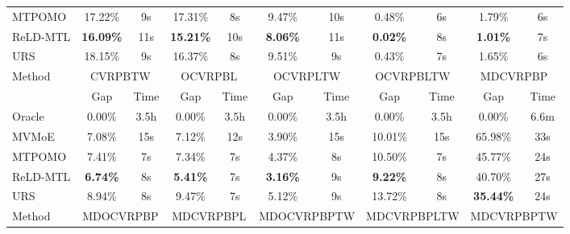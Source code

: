 \documentclass{article}
\theoremstyle{plain}
\theoremstyle{definition}
\theoremstyle{remark}
\begin{document}
\begin{table}[htbp]
{\begin{tabular}{l|cc|cc|cc|cc|cc}
MTPOMO 
&  17.22\% & 9s 
&  17.31\% & 8s 
&  9.47\%  & 10s 
& 0.48\%  & \multicolumn{1}{c|}{6s} 
& 1.79\%  & \multicolumn{1}{c}{6s} \\

ReLD-MTL 
&  \cellcolor[HTML]{D0CECE}\textbf{16.09\%} & 11s
&  \cellcolor[HTML]{D0CECE}\textbf{15.21\%} & 10s
&  \cellcolor[HTML]{D0CECE}\textbf{8.06\%}  & 11s
& \cellcolor[HTML]{D0CECE}\textbf{0.02\%}  & \multicolumn{1}{c|}{8s}
& \cellcolor[HTML]{D0CECE}\textbf{1.01\%}  & \multicolumn{1}{c}{7s} \\

URS
&  18.15\% & 9s
&  16.37\% & 8s
&  9.51\%  & 9s
& 0.43\%  & \multicolumn{1}{c|}{7s}
& 1.65\%  & \multicolumn{1}{c}{6s} \\



    \midrule
    \multirow{2}[2]{*}{Method} & \multicolumn{2}{c|}{CVRPBTW} & \multicolumn{2}{c|}{OCVRPBL} & \multicolumn{2}{c|}{OCVRPLTW} & \multicolumn{2}{c|}{OCVRPBLTW} & \multicolumn{2}{c}{MDCVRPBP} \\
          & Gap   & Time  & Gap   & Time  & Gap   & Time  & Gap   & \multicolumn{1}{c|}{Time} & Gap   & \multicolumn{1}{c}{Time} \\
    \midrule
    Oracle & 0.00\% & 3.5h  & 0.00\% & 3.5h  & 0.00\% & 3.5h  & 0.00\% & \multicolumn{1}{c|}{3.5h} & 0.00\% & \multicolumn{1}{c}{6.6m} \\
    MVMoE & 7.08\% & 15s   & 7.12\% & 12s   & 3.90\% & 15s   & 10.01\% & \multicolumn{1}{c|}{15s} &  65.98\% & \multicolumn{1}{c}{33s} \\
    MTPOMO & 7.41\% & 7s    & 7.34\% & 7s    & 4.37\% & 8s    & 10.50\% & \multicolumn{1}{c|}{7s} &  45.77\% & \multicolumn{1}{c}{24s} \\
    ReLD-MTL & \cellcolor[HTML]{D0CECE}\textbf{6.74\%} & 8s    & \cellcolor[HTML]{D0CECE}\textbf{5.41\%} & 7s    & \cellcolor[HTML]{D0CECE}\textbf{3.16\%} & 9s    & \cellcolor[HTML]{D0CECE}\textbf{9.22\%} & \multicolumn{1}{c|}{8s} &  40.70\% & \multicolumn{1}{c}{27s} \\
    URS   & 8.94\% & 8s    & 9.47\% & 7s    & 5.12\% & 9s    & 13.72\% & \multicolumn{1}{c|}{8s} &  \cellcolor[HTML]{D0CECE}\textbf{35.44\%} & \multicolumn{1}{c}{24s} \\
    \midrule
    \midrule
    \multirow{2}[2]{*}{Method} & \multicolumn{2}{c|}{MDOCVRPBP} & \multicolumn{2}{c|}{MDCVRPBPL} & \multicolumn{2}{c|}{MDOCVRPBPTW} & \multicolumn{2}{c|}{MDCVRPBPLTW} & \multicolumn{2}{c}{MDCVRPBPTW} \\

\end{tabular}}
\end{table}
\end{document}
